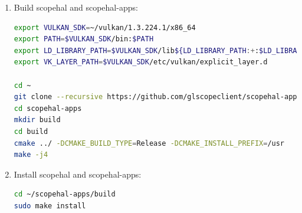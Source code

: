 \begin{enumerate}
\item Build scopehal and scopehal-apps:

\begin{lstlisting}[language=sh, numbers=none]
export VULKAN_SDK=~/vulkan/1.3.224.1/x86_64
export PATH=$VULKAN_SDK/bin:$PATH
export LD_LIBRARY_PATH=$VULKAN_SDK/lib${LD_LIBRARY_PATH:+:$LD_LIBRARY_PATH}
export VK_LAYER_PATH=$VULKAN_SDK/etc/vulkan/explicit_layer.d

cd ~
git clone --recursive https://github.com/glscopeclient/scopehal-apps.git
cd scopehal-apps
mkdir build
cd build
cmake ../ -DCMAKE_BUILD_TYPE=Release -DCMAKE_INSTALL_PREFIX=/usr
make -j4
\end{lstlisting}

\item Install scopehal and scopehal-apps:

\begin{lstlisting}[language=sh, numbers=none]
cd ~/scopehal-apps/build
sudo make install
\end{lstlisting}

\end{enumerate}

